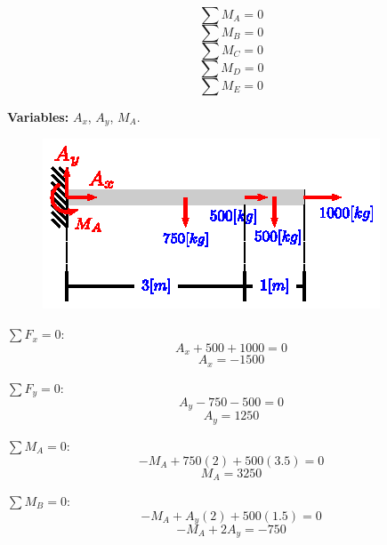 \documentclass[letter,10pt,twoside]{article}
\begin{document}
\begin{equation*}
    \sum{M_A} = 0
\end{equation*}
\begin{equation*}
    \sum{M_B} = 0
\end{equation*}
\begin{equation*}
    \sum{M_C} = 0
\end{equation*}
\begin{equation*}
    \sum{M_D} = 0
\end{equation*}
\begin{equation*}
    \sum{M_E} = 0
\end{equation*}

\textbf{Variables:} $A_x$, $A_y$, $M_A$.
\\

\begin{figure}[H]
\centering
\includegraphics[scale=1.8]{resources/h06.eps}
\end{figure}

$\sum{F_x} = 0$:
\begin{equation*}
    A_x + 500 + 1000 = 0
\end{equation*}
\begin{equation*}
    A_x = -1500
\end{equation*}

$\sum{F_y} = 0$:
\begin{equation*}
    A_y - 750 - 500 = 0
\end{equation*}
\begin{equation*}
    A_y = 1250
\end{equation*}

$\sum{M_A} = 0$:
\begin{equation*}
    - M_A + 750(2) + 500(3.5) = 0
\end{equation*}
\begin{equation*}
    M_A = 3250
\end{equation*}

$\sum{M_B} = 0$:
\begin{equation*}
    - M_A + A_y(2) + 500(1.5) = 0
\end{equation*}
\begin{equation*}
    - M_A + 2 A_y = -750
\end{equation*}
\end{document}
